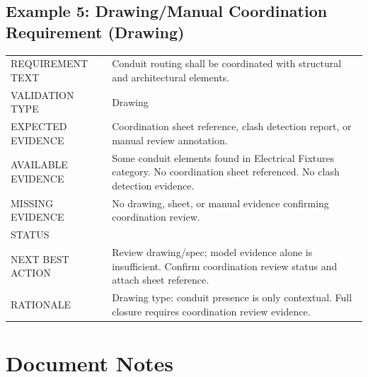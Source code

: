 \documentclass[10pt,letterpaper]{article}
\newcommand{\smalllabel}[1]{{\scriptsize\textcolor{emaMuted}{\MakeUppercase{#1}}}}
\newcommand{\badge}[3]{\tcbox[on line,colback=#2,colframe=#2,boxrule=0pt,
    arc=2mm,left=5pt,right=5pt,top=2pt,bottom=2pt]{\scriptsize\textbf{\textcolor{#3}{#1}}}}
\newcommand{\insufficientbadge}{\badge{Insufficient Model Data}{emaPurpleBg}{emaPurple}}
\begin{document}
\subsection*{Example 5: Drawing/Manual Coordination Requirement (Drawing)}

\begin{tcolorbox}[colback=white]
\begin{tabularx}{\textwidth}{p{1.4in}p{4.8in}}
\toprule
\smalllabel{Requirement Text} & Conduit routing shall be coordinated with structural and
  architectural elements. \\
\smalllabel{Validation Type} & Drawing \\
\smalllabel{Expected Evidence} & Coordination sheet reference, clash detection report, or manual
  review annotation. \\
\smalllabel{Available Evidence} & Some conduit elements found in Electrical Fixtures category. No
  coordination sheet referenced. No clash detection evidence. \\
\smalllabel{Missing Evidence} & No drawing, sheet, or manual evidence confirming coordination review.
\\
\smalllabel{Status} & \insufficientbadge \\
\smalllabel{Next Best Action} & Review drawing/spec; model evidence alone is insufficient. Confirm
  coordination review status and attach sheet reference. \\
\smalllabel{Rationale} & Drawing type: conduit presence is only contextual. Full closure requires
  coordination review evidence. \\
\bottomrule
\end{tabularx}
\end{tcolorbox}

\clearpage
\section*{Document Notes}
\end{document}
